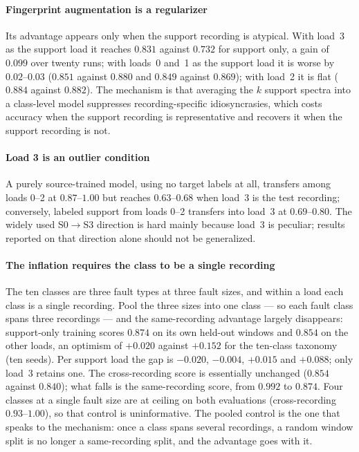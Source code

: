 \documentclass[preprint,12pt]{elsarticle}
\begin{document}
\paragraph{Fingerprint augmentation is a regularizer}
Its advantage appears only when the support recording is atypical. With
load~3 as the support load it reaches $0.831$ against $0.732$ for support only,
a gain of $0.099$ over twenty runs; with loads~0 and~1 as the support load it
is worse by $0.02$--$0.03$ ($0.851$ against $0.880$ and $0.849$ against
$0.869$); with load~2 it is flat ($0.884$ against $0.882$). The mechanism is
that averaging the $k$ support spectra into a class-level model suppresses
recording-specific idiosyncrasies, which costs accuracy when the support
recording is representative and recovers it when the support recording is not.

\paragraph{Load 3 is an outlier condition}
A purely source-trained model, using no target labels at all, transfers among
loads 0--2 at $0.87$--$1.00$ but reaches $0.63$--$0.68$ when load~3 is the test
recording; conversely, labeled support from loads 0--2 transfers into load~3 at
$0.69$--$0.80$. The widely used S0$\rightarrow$S3 direction is hard mainly
because load~3 is peculiar; results reported on that direction alone should not
be generalized.

\paragraph{The inflation requires the class to be a single recording}
The ten classes are three fault types at three fault sizes, and within a load
each class is a single recording. Pool the three sizes into one class --- so
each fault class spans three recordings --- and the same-recording advantage
largely disappears: support-only training scores $0.874$ on its own held-out
windows and $0.854$ on the other loads, an optimism of $+0.020$ against
$+0.152$ for the ten-class taxonomy (ten seeds). Per support load the gap is
$-0.020$, $-0.004$, $+0.015$ and $+0.088$; only load~3 retains one. The
cross-recording score is essentially unchanged ($0.854$ against $0.840$); what
falls is the same-recording score, from $0.992$ to $0.874$. Four classes at a
single fault size are at ceiling on both evaluations (cross-recording
$0.93$--$1.00$), so that control is uninformative. The pooled control is the
one that speaks to the mechanism: once a class spans several recordings, a
random window split is no longer a same-recording split, and the advantage
goes with it.
\end{document}
